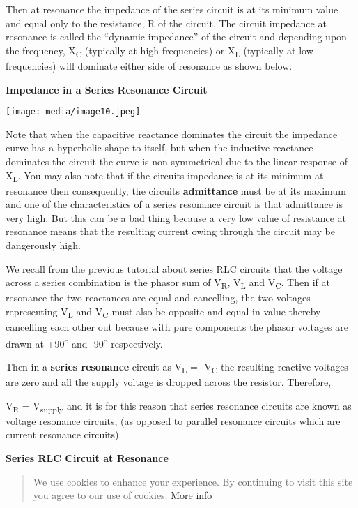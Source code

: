 \documentclass[]{article}
\begin{document}
Then at resonance the impedance of the series circuit is at its minimum
value and equal only to the resistance, R of the circuit. The circuit
impedance at resonance is called the ``dynamic impedance'' of the
circuit and depending upon the frequency, X\textsubscript{C} (typically
at high frequencies) or X\textsubscript{L} (typically at low
frequencies) will dominate either side of resonance as shown below.

\textbf{Impedance in a Series Resonance Circuit}

\texttt{[image: media/image10.jpeg]}

Note that when the capacitive reactance dominates the circuit the
impedance curve has a hyperbolic shape to itself, but when the inductive
reactance dominates the circuit the curve is non-symmetrical due to the
linear response of X\textsubscript{L}. You may also note that if the
circuits impedance is at its minimum at resonance then consequently, the
circuits \textbf{admittance} must be at its maximum and one of the
characteristics of a series resonance circuit is that admittance is very
high. But this can be a bad thing because a very low value of resistance
at resonance means that the resulting current owing through the circuit
may be dangerously high.

We recall from the previous tutorial about series RLC circuits that the
voltage across a series combination is the phasor sum of
V\textsubscript{R}, V\textsubscript{L} and V\textsubscript{C}. Then if
at resonance the two reactances are equal and cancelling, the two
voltages representing V\textsubscript{L} and V\textsubscript{C} must
also be opposite and equal in value thereby cancelling each other out
because with pure components the phasor voltages are drawn at
+90\textsuperscript{o} and -90\textsuperscript{o} respectively.

Then in a \textbf{series resonance} circuit as V\textsubscript{L} =
-V\textsubscript{C} the resulting reactive voltages are zero and all the
supply voltage is dropped across the resistor. Therefore,

V\textsubscript{R} = V\textsubscript{supply} and it is for this reason
that series resonance circuits are known as voltage resonance circuits,
(as opposed to parallel resonance circuits which are current resonance
circuits).

\textbf{Series RLC Circuit at Resonance}

\begin{quote}
We use cookies to enhance your experience. By continuing to visit this
site you agree to our use of cookies.
\href{http://wikipedia.org/wiki/HTTP_cookie}{More info}
\end{quote}
\end{document}
